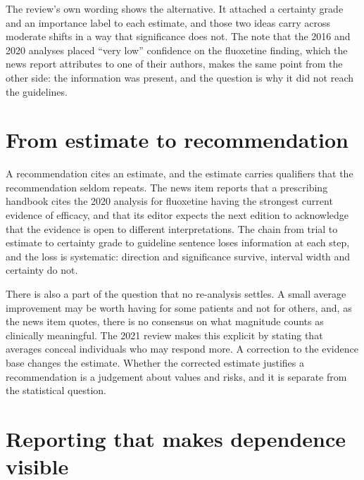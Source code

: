 \documentclass[11pt]{article}
\theoremstyle{definition}
\begin{document}
The review's own wording shows the alternative. It attached a certainty grade and an importance label to each estimate, and those two ideas carry across moderate shifts in a way that significance does not. The note that the 2016 and 2020 analyses placed ``very low'' confidence on the fluoxetine finding, which the news report attributes to one of their authors, makes the same point from the other side: the information was present, and the question is why it did not reach the guidelines.

\section{From estimate to recommendation}

A recommendation cites an estimate, and the estimate carries qualifiers that the recommendation seldom repeats. The news item reports that a prescribing handbook cites the 2020 analysis for fluoxetine having the strongest current evidence of efficacy, and that its editor expects the next edition to acknowledge that the evidence is open to different interpretations. The chain from trial to estimate to certainty grade to guideline sentence loses information at each step, and the loss is systematic: direction and significance survive, interval width and certainty do not.

There is also a part of the question that no re-analysis settles. A small average improvement may be worth having for some patients and not for others, and, as the news item quotes, there is no consensus on what magnitude counts as clinically meaningful. The 2021 review makes this explicit by stating that averages conceal individuals who may respond more. A correction to the evidence base changes the estimate. Whether the corrected estimate justifies a recommendation is a judgement about values and risks, and it is separate from the statistical question.

\section{Reporting that makes dependence visible}
\end{document}
